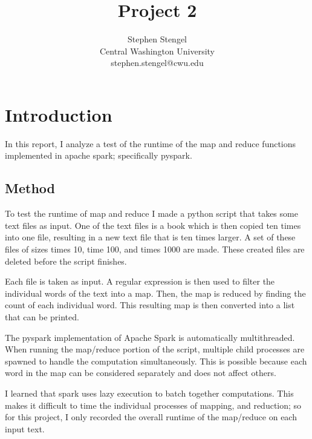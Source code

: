 \documentclass[12pt, letterpaper]{article}
\title{Project 2}
\author{Stephen Stengel\\Central Washington University\\stephen.stengel@cwu.edu}
\begin{document}
\begin{titlepage}
\maketitle


\end{titlepage}


\tableofcontents
\listoffigures
\newpage


\section{Introduction}
In this report, I analyze a test of the runtime of the map and reduce functions implemented in apache spark; specifically pyspark.


\subsection{Method}
To test the runtime of map and reduce I made a python script that takes some text files as input. One of the text files is a book which is then copied ten times into one file, resulting in a new text file that is ten times larger. A set of these files of sizes times 10, time 100, and times 1000 are made. These created files are deleted before the script finishes.

Each file is taken as input. A regular expression is then used to filter the individual words of the text into a map. Then, the map is reduced by finding the count of each individual word. This resulting map is then converted into a list that can be printed.

The pyspark implementation of Apache Spark is automatically multithreaded. When running the map/reduce portion of the script, multiple child processes are spawned to handle the computation simultaneously. This is possible because each word in the map can be considered separately and does not affect others.

I learned that spark uses lazy execution to batch together computations. This makes it difficult to time the individual processes of mapping, and reduction; so for this project, I only recorded the overall runtime of the map/reduce on each input text.
\end{document}
